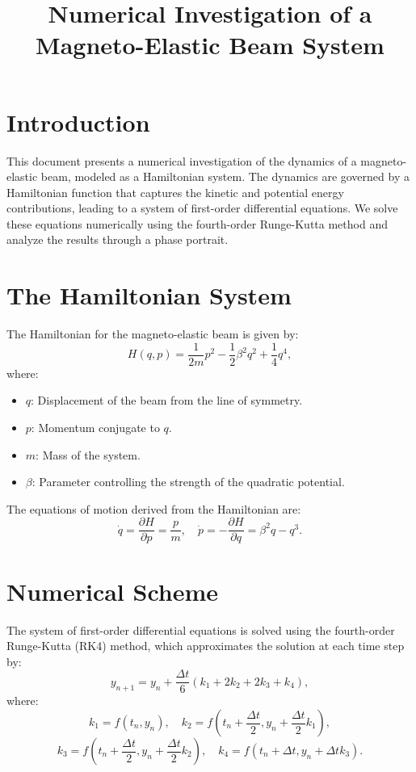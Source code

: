 \documentclass[11pt]{article}
\title{Numerical Investigation of a Magneto-Elastic Beam System}
\author{}
\date{}
\begin{document}
\maketitle

\section*{Introduction}
This document presents a numerical investigation of the dynamics of a magneto-elastic beam, modeled as a Hamiltonian system. The dynamics are governed by a Hamiltonian function that captures the kinetic and potential energy contributions, leading to a system of first-order differential equations. We solve these equations numerically using the fourth-order Runge-Kutta method and analyze the results through a phase portrait.

\section*{The Hamiltonian System}
The Hamiltonian for the magneto-elastic beam is given by:
\[
H(q, p) = \frac{1}{2m} p^2 - \frac{1}{2} \beta^2 q^2 + \frac{1}{4} q^4,
\]
where:
\begin{itemize}
    \item \( q \): Displacement of the beam from the line of symmetry.
    \item \( p \): Momentum conjugate to \( q \).
    \item \( m \): Mass of the system.
    \item \( \beta \): Parameter controlling the strength of the quadratic potential.
\end{itemize}

The equations of motion derived from the Hamiltonian are:
\[
\dot{q} = \frac{\partial H}{\partial p} = \frac{p}{m}, \quad
\dot{p} = -\frac{\partial H}{\partial q} = \beta^2 q - q^3.
\]

\section*{Numerical Scheme}
The system of first-order differential equations is solved using the fourth-order Runge-Kutta (RK4) method, which approximates the solution at each time step by:
\[
y_{n+1} = y_n + \frac{\Delta t}{6}(k_1 + 2k_2 + 2k_3 + k_4),
\]
where:
\[
k_1 = f(t_n, y_n), \quad
k_2 = f\left(t_n + \frac{\Delta t}{2}, y_n + \frac{\Delta t}{2}k_1\right),
\]
\[
k_3 = f\left(t_n + \frac{\Delta t}{2}, y_n + \frac{\Delta t}{2}k_2\right), \quad
k_4 = f(t_n + \Delta t, y_n + \Delta t k_3).
\]
\end{document}
